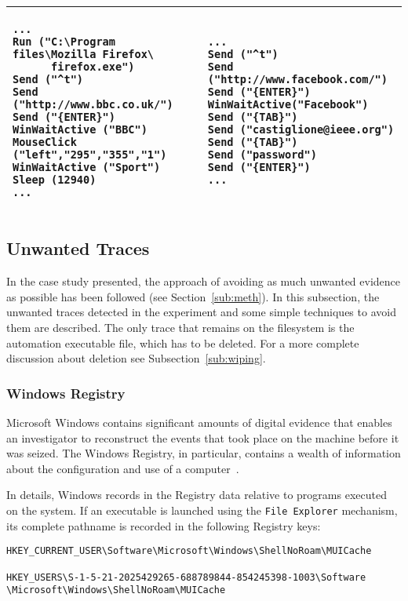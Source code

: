 \documentclass[runningheads]{llncs}
\begin{document}
\noindent
\begin{tabular}{| p{} | p{} |}
\hline
\vspace{-0.4cm}
{\footnotesize
\begin{verbatim}
...
Run ("C:\Program files\Mozilla Firefox\
      firefox.exe")
Send ("^t")
Send ("http://www.bbc.co.uk/")
Send ("{ENTER}")
WinWaitActive ("BBC")
MouseClick ("left","295","355","1")
WinWaitActive ("Sport")
Sleep (12940)
...
\end{verbatim}
}
\vspace{-0.6cm}
&
\vspace{-0.4cm}
{\footnotesize
\begin{verbatim}
...
Send ("^t")
Send ("http://www.facebook.com/")
Send ("{ENTER}")
WinWaitActive("Facebook")
Send ("{TAB}")
Send ("castiglione@ieee.org")
Send ("{TAB}")
Send ("password")
Send ("{ENTER}")
...
\end{verbatim}
}
\vspace{-0.6cm}
\\
\hline
\end{tabular}


\subsection{Unwanted Traces}
In the case study presented, the approach of avoiding as much unwanted evidence as possible has been followed (see Section~\ref{sub:meth}). In this subsection, the unwanted traces detected in the experiment and some simple techniques to avoid them are described. The only trace that remains on the filesystem is the automation executable file, which has to be deleted. For a more complete discussion about deletion see Subsection~\ref{sub:wiping}.

\subsubsection{Windows Registry}
Microsoft Windows contains significant amounts of digital
evidence that enables an investigator to reconstruct the
events that took place on the machine before it was
seized. The Windows Registry, in particular, contains
a wealth of information about the configuration and use
of a computer~\cite{Carrier}.

In details, Windows records in the Registry data relative to programs executed on the system. If an executable is launched using the \verb=File Explorer= mechanism, its complete pathname is recorded in the following Registry keys:
{%
\begin{verbatim}
HKEY_CURRENT_USER\Software\Microsoft\Windows\ShellNoRoam\MUICache

HKEY_USERS\S-1-5-21-2025429265-688789844-854245398-1003\Software
\Microsoft\Windows\ShellNoRoam\MUICache
\end{verbatim}
}
\end{document}
